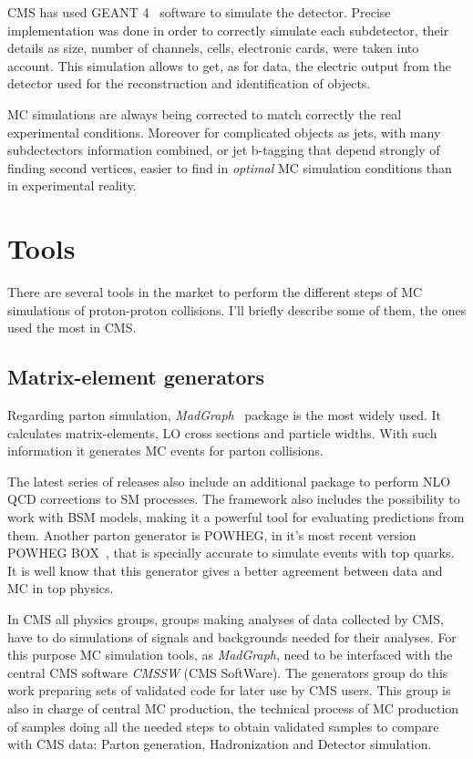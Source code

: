 CMS has used GEANT 4~\cite{Agostinelli:2002hh} software to simulate the detector. Precise implementation was done in order to correctly simulate each subdetector, their details as size, number of channels, cells, electronic cards, were taken into account. This simulation allows to get, as for data, the electric output from the detector used for the reconstruction and identification of objects. 

MC simulations are always being corrected to match correctly the real experimental conditions. Moreover for complicated objects as jets, with many subdectectors information combined, or jet b-tagging that depend strongly of finding second vertices, easier to find in \textit{optimal} MC simulation conditions than in experimental reality.

\section{Tools}
\label{sec:tools}

There are several tools in the market to perform the different steps of MC simulations of proton-proton collisions. I'll briefly describe some of them, the ones used the most in CMS.

\subsection{Matrix-element generators}
\label{sec:ME}

Regarding parton simulation, \textit{MadGraph}~\cite{Alwall:2014hca, Alwall:2011uj} package is the most widely used. It calculates matrix-elements, LO cross sections and particle widths. With such information it generates MC events for parton collisions. 

The latest series of releases also include an additional package to perform NLO QCD corrections to SM processes. The framework also includes the possibility to work with BSM models, making it a powerful tool for evaluating predictions from them. Another parton generator is POWHEG, in it's most recent version POWHEG BOX~\cite{Nason:2004rx, Frixione:2007vw, Alioli:2010xd}, that is specially accurate to simulate events with top quarks. It is well know that this generator gives a better agreement between data and MC in top physics.

In CMS all physics groups, groups making analyses of data collected by CMS, have to do simulations of signals and backgrounds needed for their analyses. For this purpose MC simulation tools, as \textit{MadGraph}, need to be interfaced with the central CMS software \textit{CMSSW} (CMS SoftWare). The generators group do this work preparing sets of validated code for later use by CMS users. This group is also in charge of central MC production, the technical process of MC production of samples doing all the needed steps to obtain validated samples to compare with CMS data: Parton generation, Hadronization and Detector simulation. 

